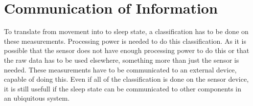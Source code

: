 \section{Communication of Information} %
\label{sec:communicating_relevant_information}
To translate from movement into to sleep state, a classification has to be done on these measurements. Processing power is needed to do this classification. As it is possible that the sensor does not have enough processing power to do this or that the raw data has to be used elsewhere, something more than just the sensor is needed. These measurements have to be communicated to an external device, capable of doing this. Even if all of the classification is done on the sensor device, it is still usefull if the sleep state can be communicated to other components in an ubiquitous system.

